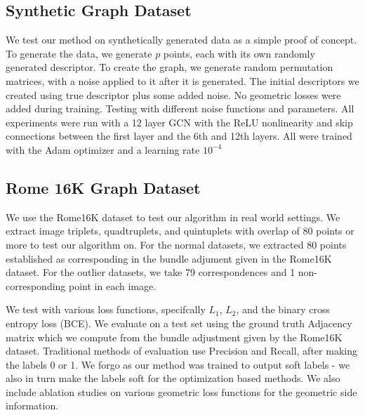 \documentclass[10pt,twocolumn,letterpaper]{article}
\begin{document}
\subsection{Synthetic Graph Dataset}
We test our method on synthetically generated data as a simple proof of concept.
To generate the data, we generate $p$ points, each with its own randomly generated descriptor.
To create the graph, we generate random permutation matrices, with a noise applied to it after it is generated.
The initial descriptors we created using true descriptor plus some added noise.
No geometric losses were added during training.
Testing with different noise functions and parameters.
All experiments were run with a 12 layer GCN with the ReLU nonlinearity and skip connections between the first layer and the 6th and 12th layers.
All were trained with the Adam optimizer and a learning rate $10^{-4}$


\subsection{Rome 16K Graph Dataset}
We  use the Rome16K dataset \cite{li2010location} to test our algorithm in real world settings.
We extract image triplets, quadtruplets, and quintuplets with overlap of 80 points or more to test our algorithm on. For the normal datasets, we extracted 80 points established as corresponding in the bundle adjument given in the Rome16K dataset. For the outlier datasets, we take 79 correspondences and 1 non-corresponding point in each image.

We test with various loss functions, specifcally $L_1$, $L_2$, and the binary cross entropy loss (BCE).
We evaluate on a test set using the ground truth Adjacency matrix which we compute from the bundle adjustment given by the Rome16K dataset.
Traditional methods of evaluation use Precision and Recall, after making the labels 0 or 1.
We forgo as our method was trained to output soft labels - we also in turn make the labels soft for the optimization based methods.
We also include ablation studies on various geometric loss functions for the geometric side information.

\end{document}
